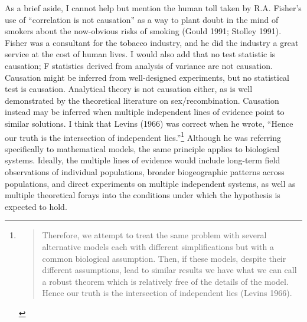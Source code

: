 \documentclass[
  letterpaper,
]{book}
\begin{document}
As a brief aside, I cannot help but mention the human toll taken by R.A.
Fisher's use of ``correlation is not causation'' as a way to plant doubt
in the mind of smokers about the now-obvious risks of smoking (Gould
1991; Stolley 1991). Fisher was a consultant for the tobacco industry,
and he did the industry a great service at the cost of human lives. I
would also add that no test statistic is causation; F statistics derived
from analysis of variance are not causation. Causation might be inferred
from well-designed experiments, but no statistical test is causation.
Analytical theory is not causation either, as is well demonstrated by
the theoretical literature on sex/recombination. Causation instead may
be inferred when multiple independent lines of evidence point to similar
solutions. I think that Levins (1966) was correct when he wrote, ``Hence
our truth is the intersection of independent lies.''\footnote{\begin{quote}
  Therefore, we attempt to treat the same problem with several
  alternative models each with different simplifications but with a
  common biological assumption. Then, if these models, despite their
  different assumptions, lead to similar results we have what we can
  call a robust theorem which is relatively free of the details of the
  model. Hence our truth is the intersection of independent lies (Levins
  1966).
  \end{quote}} Although he was referring specifically to mathematical
models, the same principle applies to biological systems. Ideally, the
multiple lines of evidence would include long-term field observations of
individual populations, broader biogeographic patterns across
populations, and direct experiments on multiple independent systems, as
well as multiple theoretical forays into the conditions under which the
hypothesis is expected to hold.
\end{document}
